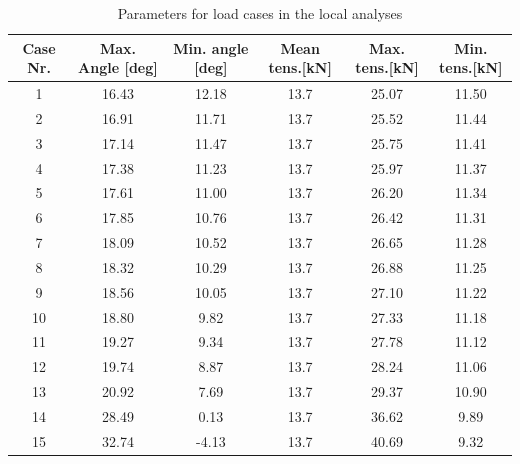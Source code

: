\begin{table} [H]
\centering
\begin{tabular}{ |c|c|c|c|c|c|}
\hline
    Case Nr. & Max. Angle [deg] & Min. angle [deg] & Mean tens.[kN] & Max. tens.[kN]  & Min. tens.[kN]   \\
 \hline
 \hline
    1 & 16.43 & 12.18 & 13.7 & 25.07 & 11.50   \\ 
    2 &  16.91 & 11.71 & 13.7 & 25.52 & 11.44   \\
    3 &  17.14 & 11.47 & 13.7 & 25.75 & 11.41   \\ 
    4 &  17.38 & 11.23 & 13.7 & 25.97 & 11.37  \\ 
    5 &  17.61 & 11.00 & 13.7 & 26.20 & 11.34  \\ 
    6 &  17.85 & 10.76 & 13.7 & 26.42 & 11.31  \\ 
    7 &  18.09 & 10.52 & 13.7 & 26.65 & 11.28   \\ 
    8 &  18.32 & 10.29 & 13.7 & 26.88 & 11.25  \\ 
    9 &  18.56 & 10.05 & 13.7 & 27.10 & 11.22  \\ 
    10 &  18.80 & 9.82 & 13.7 & 27.33 & 11.18  \\ 
    11 & 19.27 & 9.34 & 13.7 & 27.78 & 11.12  \\ 
    12 &  19.74 & 8.87 & 13.7 & 28.24 & 11.06  \\ 
    13 &  20.92 & 7.69 & 13.7 & 29.37 & 10.90  \\ 
    14 &  28.49 & 0.13 & 13.7 & 36.62 & 9.89  \\ 
    15 &  32.74 & -4.13 & 13.7 & 40.69 & 9.32 \\ 
 \hline
\end{tabular}
\caption{Parameters for load cases in the local analyses}
\label{table:loadcase}
\end{table} 

